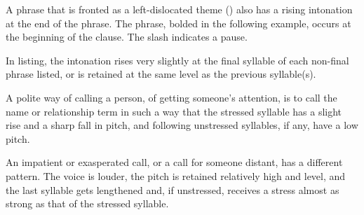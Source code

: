 A phrase that is fronted as a left-dislocated theme () also has a rising intonation at the end of the phrase.  The phrase, bolded in the following example, occurs at the beginning of the clause.  The slash indicates a pause.

 

  
In listing, the intonation rises very slightly at the final syllable of each non-final phrase listed, or is retained at the same level as the previous syllable(s).


 

A polite way of calling a person, of getting someone's attention, is to call the name or relationship term in such a way that the stressed syllable has a slight rise and a sharp fall in pitch, and following unstressed syllables, if any, have a low pitch.




An impatient or exasperated call, or a call for someone distant, has a different pattern.  The voice is louder, the pitch is retained relatively high and level, and the last syllable gets lengthened and, if unstressed, receives a stress almost as strong as that of the stressed syllable.

 

